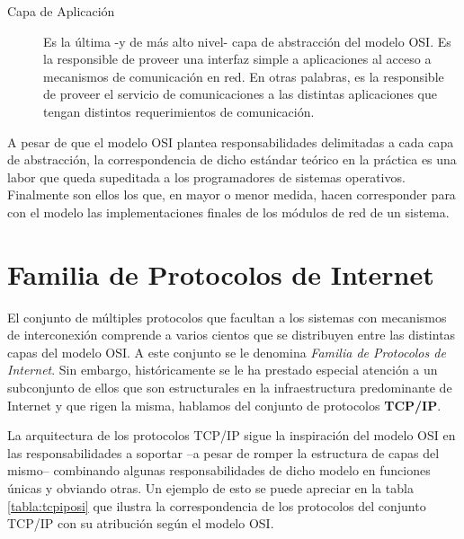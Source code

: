 \begin{intro}
\begin{description}
\item[Capa de Aplicación] Es la última -y de más alto nivel- capa de abstracción del modelo OSI. Es la responsible de proveer una interfaz simple a aplicaciones al acceso a mecanismos de comunicación en red. En otras palabras, es la responsible de proveer el servicio de comunicaciones a las distintas aplicaciones que tengan distintos requerimientos de comunicación.

\end{description}

A pesar de que el modelo OSI plantea responsabilidades delimitadas a cada capa de abstracción, la correspondencia de dicho estándar teórico en la práctica es una labor que queda supeditada a los programadores de sistemas operativos. Finalmente son ellos los que, en mayor o menor medida, hacen corresponder para con el modelo las implementaciones finales de los módulos de red de un sistema.


\section*{Familia de Protocolos de Internet}
El conjunto de múltiples protocolos que facultan a los sistemas con mecanismos de interconexión comprende a varios cientos que se distribuyen entre las distintas capas del modelo OSI. A este conjunto se le denomina \emph{Familia de Protocolos de Internet}. Sin embargo, históricamente se le ha prestado especial atención a un subconjunto de ellos que son estructurales en la infraestructura predominante de Internet y que rigen la misma, hablamos del conjunto de protocolos \textbf{TCP/IP}.

La arquitectura de los protocolos TCP/IP sigue la inspiración del modelo OSI en las responsabilidades a soportar --a pesar de romper la estructura de capas del mismo-- combinando algunas responsabilidades de dicho modelo en funciones únicas y obviando otras. Un ejemplo de esto se puede apreciar en la tabla \ref{tabla:tcpiposi} que ilustra la correspondencia de los protocolos del conjunto TCP/IP con su atribución según el modelo OSI.


\end{intro}
